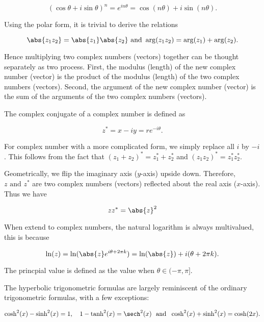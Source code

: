 \documentclass[english,a4paper,12pt]{report}
\begin{document}
\begin{equation}
	(\cos \theta + i \sin \theta )^{n} = e^{i n \theta } = \cos (n \theta ) + i \sin (n \theta ).
\end{equation}

Using the polar form, it is trivial to derive the relations

\begin{equation}
	\abs{z_1 z_2 } = \abs{z_1 }\abs{z_2 } \text { and } \arg (z_1 z_2 ) = \arg (z_1 ) + \arg (z_2 ).
\end{equation}

Hence multiplying two complex numbers (vectors) together can be thought separately as two process. First, the modulus (length) of the new complex number (vector) is the product of the modulus (length) of the two complex numbers (vectors). Second, the argument of the new complex number (vector) is the sum of the arguments of the two complex numbers (vectors).

The complex conjugate of a complex number is defined as 

\begin{equation}
	z^* = x-iy = re^{-i \theta }.
\end{equation}

For complex number with a more complicated form, we simply replace all \(i\) by \(-i\). This follows from the fact that \((z_1 + z_2 )^* = z_1 ^* + z_2 ^*\) and \((z_1 z_2 )^* = z_1 ^* z_2 ^*\).  

Geometrically, we flip the imaginary axis (\(y\)-axis) upside down. Therefore, \(z \text { and } z^*\) are two complex numbers (vectors) reflected about the real axis (\(x\)-axis). Thus we have

\begin{equation}
	z z^* = \abs{z}^2 
\end{equation}

When extend to complex numbers, the natural logarithm is always multivalued, this is because 

\begin{equation}
    \ln (z) = \ln (\abs{z}e^{i \theta + 2\pi k}  ) = \ln (\abs{z} ) + i (\theta +2\pi k).
\end{equation}

The princpial value is defined as the value when \(\theta \in (-\pi ,\pi ]\).  

The hyperbolic trigonometric formulas are largely reminiscent of the ordinary trigonometric formulas, with a few exceptions:

\begin{equation}
    \cosh^2(x) - \sinh^2(x) = 1, \quad 1 - \tanh^2(x) = \sech^2(x) ~\text { and }~  \cosh^2(x) + \sinh^2(x) = \cosh(2x).
\end{equation}
\end{document}
